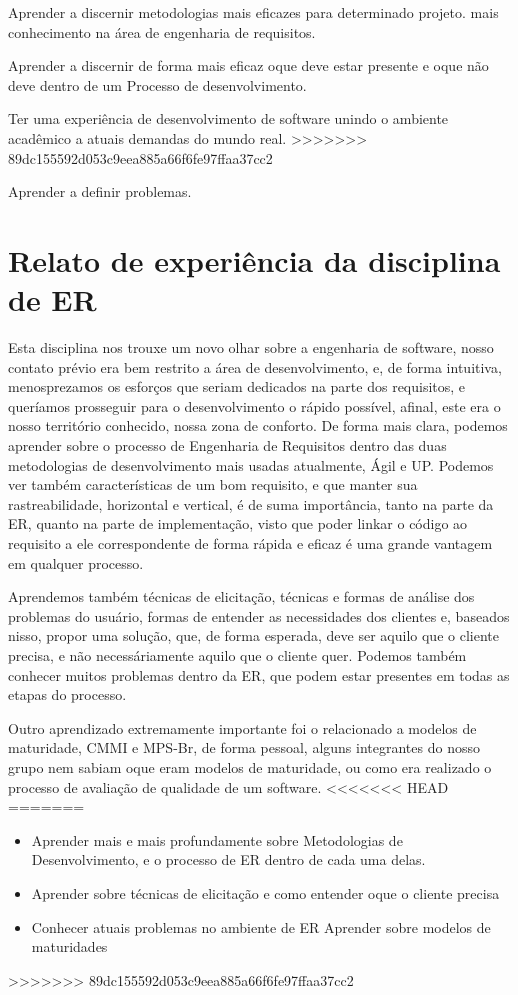   Aprender a discernir metodologias mais eficazes para determinado projeto.
  mais conhecimento na área de engenharia de requisitos.

  Aprender a discernir de forma mais eficaz oque deve estar presente e oque não deve dentro de um Processo de desenvolvimento.

  Ter uma experiência de desenvolvimento de software unindo o ambiente acadêmico a atuais demandas do mundo real.
>>>>>>> 89dc155592d053c9eea885a66f6fe97ffaa37cc2

  Aprender a definir problemas.

\section{Relato de experiência da disciplina de ER}

Esta disciplina nos trouxe um novo olhar sobre a engenharia de software,
nosso contato prévio era bem restrito a área de desenvolvimento, e, de forma intuitiva, menosprezamos os esforços
que seriam dedicados na parte dos requisitos, e queríamos prosseguir para o desenvolvimento o rápido possível,
afinal, este era o nosso território conhecido, nossa zona de conforto.
De forma mais clara, podemos aprender sobre o processo de Engenharia de Requisitos dentro das duas metodologias
de desenvolvimento mais usadas atualmente, Ágil e UP.
Podemos ver também características de um bom requisito, e que manter sua rastreabilidade, horizontal e vertical,
é de suma importância, tanto na parte da ER, quanto na parte de implementação, visto que poder linkar o código
ao requisito a ele correspondente de forma rápida e eficaz é uma grande vantagem em qualquer processo.

Aprendemos também técnicas de elicitação, técnicas e formas de análise dos problemas do usuário,
formas de entender as necessidades dos clientes e, baseados nisso, propor uma solução, que, de forma esperada,
deve ser aquilo que o cliente precisa, e não necessáriamente aquilo que o cliente quer.
Podemos também conhecer muitos problemas dentro da ER, que podem estar presentes em todas as etapas do processo.

Outro aprendizado extremamente importante foi o relacionado a modelos de maturidade, CMMI e MPS-Br, de forma pessoal,
alguns integrantes do nosso grupo nem sabiam oque eram modelos de maturidade, ou como era realizado o processo de
avaliação de qualidade de um software.
<<<<<<< HEAD
=======

\begin{itemize}
\item Aprender mais e mais profundamente sobre Metodologias de Desenvolvimento, e o processo de ER dentro de cada uma delas.
\item Aprender sobre técnicas de elicitação e como entender oque o cliente precisa
\item Conhecer atuais problemas no ambiente de ER
  Aprender sobre modelos de maturidades

\end{itemize}
>>>>>>> 89dc155592d053c9eea885a66f6fe97ffaa37cc2
